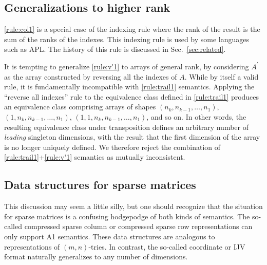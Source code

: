 
\subsection{Generalizations to higher rank}

\ref{rule:col1} is a special case of the indexing rule where the rank of the
result is the sum of the ranks of the indexes. This indexing rule is used by
some languages such as APL. The history of this rule is discussed in
Sec.~\ref{sec:related}.

It is tempting to generalize \ref{rule:v'1} to arrays of general rank, by
considering $A^\prime$ as the array constructed by reversing all the indexes of
$A$. While by itself a valid rule, it is fundamentally incompatible with
\ref{rule:trail1} semantics. Applying the ``reverse all indexes'' rule to the
equivalence class defined in \ref{rule:trail1} produces an equivalence class
comprising arrays of shapes $(n_k, n_{k-1}, \dots, n_1)$, $(1, n_k, n_{k-1},
\dots, n_1)$, $(1, 1, n_k, n_{k-1}, \dots, n_1)$, and so on. In other words,
the resulting equivalence class under transposition defines an arbitrary number
of \textit{leading} singleton dimensions, with the result that the first
dimension of the array is no longer uniquely defined. We therefore reject the
combination of \ref{rule:trail1}+\ref{rule:v'1} semantics as mutually
inconsistent.



\subsection{Data structures for sparse matrices}

This discussion may seem a little silly, but one should recognize
that the situation for sparse matrices is a confusing hodgepodge of
both kinds of semantics. The so-called compressed sparse column or
compressed sparse row representations can only support A1 semantics.
These data structures are analogous to representations of $\left(m,n\right)$-tries.
In contrast, the so-called coordinate or IJV format naturally generalizes
to any number of dimensions.

